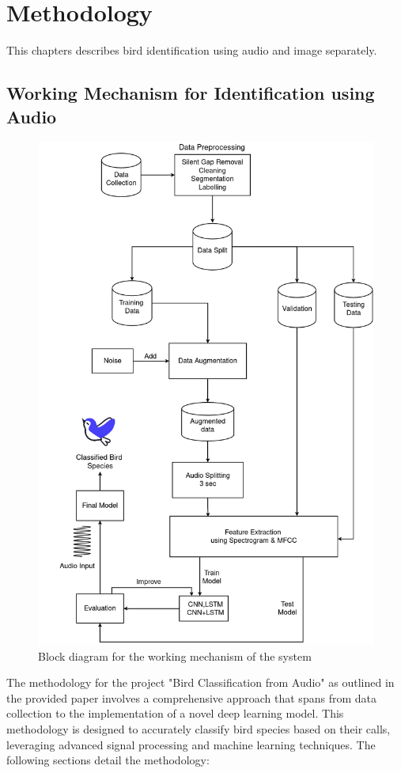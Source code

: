 \chapter{Methodology}
This chapters describes bird identification using audio and image separately.
\section{Working Mechanism for Identification using Audio}
\begin{figure}[h!]
    \centering
        \includegraphics[scale=0.33]{images/Methodology1.png}
        \caption{Block diagram for the working mechanism of the system}%
    \end{figure}
\newpage
The methodology for the project "Bird Classification from Audio" as outlined in the provided paper involves a comprehensive approach that spans from data collection to the implementation of a novel deep learning model. This methodology is designed to accurately classify bird species based on their calls, leveraging advanced signal processing and machine learning techniques. The following sections detail the methodology:


